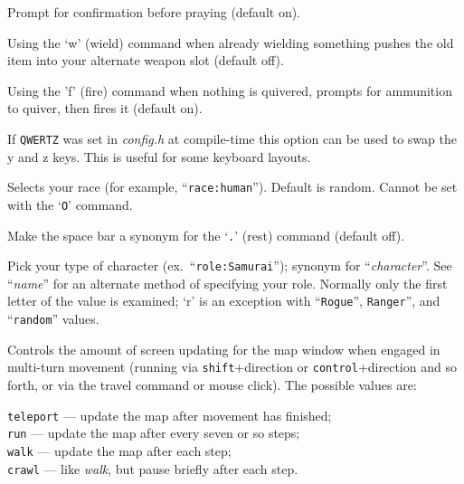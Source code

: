 \item[\ib{prayconfirm}]
Prompt for confirmation before praying (default on).
\item[\ib{pushweapon}]
Using the `w' (wield) command when already wielding
something pushes the old item into your alternate weapon slot (default off).
\item[\ib{quiver\_fired}]
Using the 'f' (fire) command when nothing is quivered, prompts for ammunition 
to quiver, then fires it (default on).
\item[\ib{qwertz\_layout}]
If {\tt QWERTZ} was set in {\it config.h} at compile-time this option can be
used to swap the y and z keys. This is useful for some keyboard layouts.
\item[\ib{race}]
Selects your race (for example, ``{\tt race:human}'').  Default is random.
Cannot be set with the `{\tt O}' command.
\item[\ib{rest\_on\_space}]
Make the space bar a synonym for the `{\tt .}' (rest) command (default off).
\item[\ib{role}]
Pick your type of character (ex.\ ``{\tt role:Samurai}'');
synonym for ``{\it character\/}''.  See ``{\it name\/}'' for an alternate method
of specifying your role.  Normally only the first letter of the
value is examined; `r' is an exception with ``{\tt Rogue}'', {\tt Ranger}'',
and ``{\tt random}'' values.
\item[\ib{runmode}]
Controls the amount of screen updating for the map window when engaged
in multi-turn movement (running via {\tt shift}+direction
or {\tt control}+direction
and so forth, or via the travel command or mouse click).
The possible values are:

{\tt teleport} --- update the map after movement has finished;\\
{\tt run} --- update the map after every seven or so steps;\\
{\tt walk} --- update the map after each step;\\
{\tt crawl} --- like {\it walk\/}, but pause briefly after each step.


